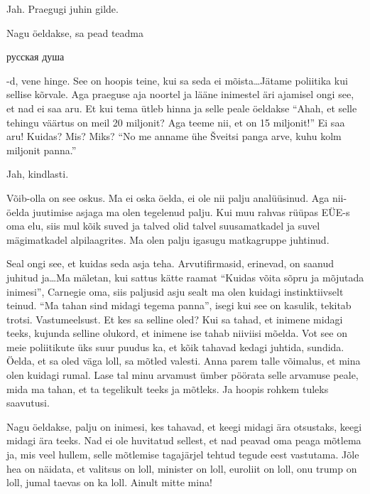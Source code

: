 Jah. Praegugi juhin gilde. 


Nagu öeldakse, sa pead teadma \begin{russian}русская душа\end{russian}-d, vene hinge. 
See on hoopis teine, kui sa seda ei mõista\ldots Jätame poliitika kui sellise kõrvale. Aga  praeguse aja noortel ja lääne inimestel äri ajamisel ongi see, et nad ei saa aru. Et kui tema ütleb hinna ja selle peale öeldakse \enquote{Ahah, et selle tehingu väärtus on meil 20 miljonit? Aga teeme nii, et on 15 miljonit!} Ei saa aru! Kuidas? Mis? Miks? \enquote{No me anname ühe Šveitsi panga arve, kuhu kolm miljonit panna.}
                 

Jah, kindlasti.


Võib-olla on see oskus. Ma ei oska öelda, ei ole nii palju analüüsinud. Aga nii-öelda juutimise asjaga ma olen tegelenud palju. Kui muu rahvas rüüpas EÜE-s oma elu, siis mul kõik suved ja talved olid talvel suusamatkadel ja suvel mägimatkadel alpilaagrites. Ma olen palju igasugu matkagruppe juhtinud.

Seal ongi see, et kuidas seda asja teha. Arvutifirmasid, erinevad, on saanud juhitud ja\ldots Ma mäletan, kui  sattus kätte raamat \enquote{Kuidas võita sõpru ja mõjutada inimesi}, Carnegie oma, siis paljusid asju sealt ma olen kuidagi instinktiivselt teinud. \enquote{Ma tahan sind midagi tegema panna}, isegi kui see on kasulik, tekitab trotsi. Vastumeelsust. Et kes sa selline oled? Kui sa tahad, et inimene midagi teeks, kujunda selline olukord, et inimene ise tahab niiviisi mõelda. Vot see on meie poliitikute üks suur puudus ka, et kõik tahavad kedagi juhtida, sundida. Öelda, et sa oled väga loll, sa mõtled valesti. Anna parem talle võimalus, et mina olen kuidagi rumal. Lase tal minu arvamust ümber pöörata selle arvamuse peale, mida ma tahan, et ta tegelikult teeks ja mõtleks. Ja hoopis rohkem tuleks  saavutusi. 

Nagu öeldakse, palju on inimesi, kes tahavad, et  keegi midagi ära otsustaks, keegi midagi ära teeks. Nad ei ole huvitatud sellest, et nad peavad oma peaga mõtlema ja, mis veel hullem, selle mõtlemise tagajärjel tehtud tegude eest vastutama. Jõle hea on näidata, et valitsus on loll, minister on loll, euroliit on loll, onu trump on loll, jumal taevas on ka loll. Ainult mitte mina!
                 
